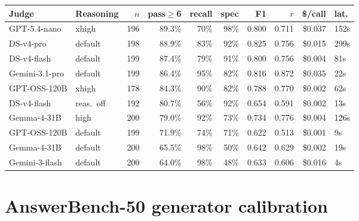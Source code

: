 \documentclass{article}
\begin{document}
\begin{table}[h]
  \centering
  \small
  \begin{tabular}{llrrrrrrrl}
    \toprule
    Judge & Reasoning & $n$ & pass$\geq$6 & recall & spec & F1 & $r$ & \$/call & lat. \\
    \midrule
    GPT-5.4-nano & xhigh & 196 & 89.3\% & 70\% & 98\% & 0.800 & 0.711 & \$0.037 & 152s \\
    DS-v4-pro & default & 198 & 88.9\% & 83\% & 92\% & 0.825 & 0.756 & \$0.015 & 299s \\
    DS-v4-flash & default & 199 & 87.4\% & 79\% & 91\% & 0.800 & 0.756 & \$0.004 & 81s \\
    Gemini-3.1-pro & default & 199 & 86.4\% & 95\% & 82\% & 0.816 & 0.872 & \$0.035 & 22s \\
    GPT-OSS-120B & xhigh & 178 & 84.3\% & 90\% & 82\% & 0.788 & 0.770 & \$0.002 & 62s \\
    DS-v4-flash & reas.\ off & 192 & 80.7\% & 56\% & 92\% & 0.654 & 0.591 & \$0.002 & 13s \\
    Gemma-4-31B & high & 200 & 79.0\% & 92\% & 73\% & 0.734 & 0.776 & \$0.004 & 126s \\
    GPT-OSS-120B & default & 199 & 71.9\% & 74\% & 71\% & 0.622 & 0.513 & \$0.001 & 9s \\
    Gemma-4-31B & default & 200 & 65.5\% & 98\% & 50\% & 0.642 & 0.629 & \$0.002 & 19s \\
    Gemini-3-flash & default & 200 & 64.0\% & 98\% & 48\% & 0.633 & 0.606 & \$0.016 & 4s \\
    \bottomrule
  \end{tabular}
\end{table}

\section{AnswerBench-50 generator calibration}
\label{app:answerbench}
\end{document}
